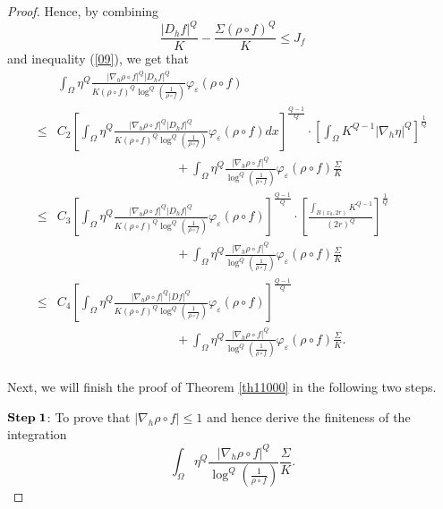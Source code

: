 \documentclass[11pt,twoside]{article}
\theoremstyle{definition}
\theoremstyle{remark}
\begin{document}
\begin{proof}
Hence,  by combining $$\frac{\vert D_{h}f\vert^{Q}}{K}-\frac{\Sigma(\rho\circ f)^{Q}}{K}\leq J_{f}$$ and inequality (\ref{09}), we get that 
\begin{equation}\label{07}
\begin{aligned}
&\int_{\Omega}\eta^{Q}\frac{\vert\nabla_{h}\rho\circ f\vert^{Q}\vert D_{h}f\vert^{Q}}{K(\rho\circ f)^{Q}\log^{Q}(\frac{1}{\rho\circ f})}\varphi_{\varepsilon}(\rho\circ f)\\
\leq& C_{2} \left[\int_{\Omega}\eta^{Q}\frac{\vert\nabla_{h}\rho\circ f\vert^{Q}\vert D_{h}f\vert^{Q}}{K(\rho\circ f)^{Q}\log^{Q}(\frac{1}{\rho\circ f})}\varphi_{\varepsilon}(\rho\circ f)dx\right]^{\frac{Q-1}{Q}}\cdot\left[\int_{\Omega}K^{Q-1}\vert\nabla_{h}\eta\vert^{Q}\right]^{\frac{1}{Q}}\\
&\;\;\;\;\;\;\;\;\;\;\;\;\;\;\;\;\;\;\;\;\;\;\;\;\;\;\;\;\;\;\;\;\;\;+\int_{\Omega}\eta^{Q}\frac{\vert\nabla_{h}\rho\circ f\vert^{Q}}{\log^{Q}(\frac{1}{\rho\circ f})}\varphi_{\varepsilon}(\rho\circ f)\frac{\Sigma}{K}\\
\leq& C_{3} \left[\int_{\Omega}\eta^{Q}\frac{\vert\nabla_{h}\rho\circ f\vert^{Q}\vert D_{h}f\vert^{Q}}{K(\rho\circ f)^{Q}\log^{Q}(\frac{1}{\rho\circ f})}\varphi_{\varepsilon}(\rho\circ f)\right]^{\frac{Q-1}{Q}}\cdot\left[\frac{\int_{B(x_{0},2r)}K^{Q-1}}{(2r)^{Q}}\right]^{\frac{1}{Q}}\\
&\;\;\;\;\;\;\;\;\;\;\;\;\;\;\;\;\;\;\;\;\;\;\;\;\;\;\;\;\;\;\;\;\;\;+\int_{\Omega}\eta^{Q}\frac{\vert\nabla_{h}\rho\circ f\vert^{Q}}{\log^{Q}(\frac{1}{\rho\circ f})}\varphi_{\varepsilon}(\rho\circ f)\frac{\Sigma}{K}\\
\leq& C_{4} \left[\int_{\Omega}\eta^{Q}\frac{\vert\nabla_{h}\rho\circ f\vert^{Q}\vert Df\vert^{Q}}{K(\rho\circ f)^{Q}\log^{Q}(\frac{1}{\rho\circ f})}\varphi_{\varepsilon}(\rho\circ f)\right]^{\frac{Q-1}{Q}}\\
&\;\;\;\;\;\;\;\;\;\;\;\;\;\;\;\;\;\;\;\;\;\;\;\;\;\;\;\;\;\;\;\;\;\;+\int_{\Omega}\eta^{Q}\frac{\vert\nabla_{h}\rho\circ f\vert^{Q}}{\log^{Q}(\frac{1}{\rho\circ f})}\varphi_{\varepsilon}(\rho\circ f)\frac{\Sigma}{K}.\\
\end{aligned}
\end{equation}

Next, we will finish the proof of Theorem \ref{th11000} in the following two steps.

${\rm \mathbf{Step}\;\mathbf{1}}$: To prove that  $\vert \nabla_{h}\rho\circ f\vert\leq 1$ and hence derive the finiteness of the integration
\begin{equation}\label{000009}
\int_{\Omega}\eta^{Q}\frac{\vert\nabla_{h}\rho\circ f\vert^{Q}}{\log^{Q}(\frac{1}{\rho\circ f})}\frac{\Sigma}{K}.
\end{equation}


\end{proof}
\end{document}
